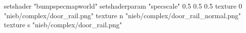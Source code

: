 setshader "bumpspecmapworld"
setshaderparam "specscale" 0.5 0.5 0.5
    texture 0 "nieb/complex/door_rail.png"
    texture n "nieb/complex/door_rail_normal.png"
    texture s "nieb/complex/door_rail.png"